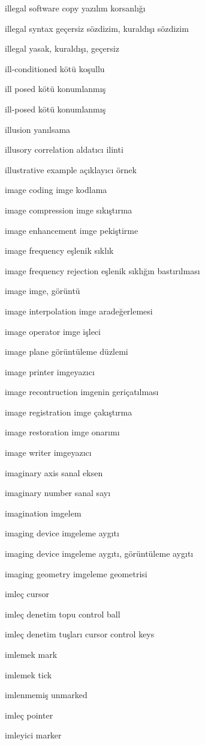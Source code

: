 \documentclass[12pt,fleqn]{article}\usepackage{../../common}
\begin{document}
illegal software copy yazılım korsanlığı

illegal syntax geçersiz sözdizim, kuraldışı sözdizim

illegal yasak, kuraldışı, geçersiz

ill-conditioned kötü koşullu

ill posed kötü konumlanmış

ill-posed kötü konumlanmış

illusion yanılsama

illusory correlation aldatıcı ilinti

illustrative example açıklayıcı örnek

image coding imge kodlama

image compression imge sıkıştırma

image enhancement imge pekiştirme

image frequency eşlenik sıklık

image frequency rejection eşlenik sıklığın bastırılması

image imge, görüntü

image interpolation imge aradeğerlemesi

image operator imge işleci

image plane görüntüleme düzlemi

image printer imgeyazıcı

image recontruction imgenin geriçatılması

image registration imge çakıştırma

image restoration imge onarımı

image writer imgeyazıcı

imaginary axis sanal eksen

imaginary number sanal sayı

imagination imgelem

imaging device imgeleme aygıtı

imaging device imgeleme aygıtı, görüntüleme aygıtı

imaging geometry imgeleme geometrisi

imleç cursor

imleç denetim topu control ball

imleç denetim tuşları cursor control keys

imlemek mark

imlemek tick

imlenmemiş unmarked

imleç pointer

imleyici marker
\end{document}
